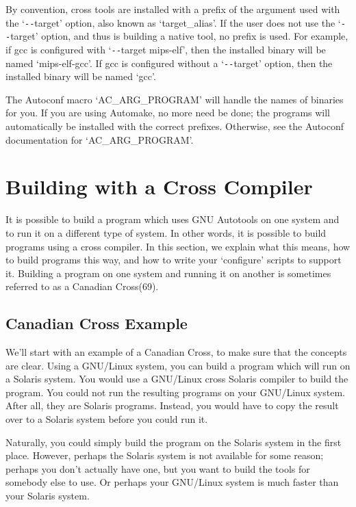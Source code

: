 By convention, cross tools are installed with a prefix of the argument used with the `\verb+--+target' option, also known as `target\_{}alias'. If the user does not use the `\verb+--+target' option, and thus is building a native tool, no prefix is used. For example, if gcc is configured with `\verb+--+target mips-elf', then the installed binary will be named `mips-elf-gcc'. If gcc is configured without a `\verb+--+target' option, then the installed binary will be named `gcc'.

The Autoconf macro `AC\_{}ARG\_{}PROGRAM' will handle the names of binaries for you. If you are using Automake, no more need be done; the programs will automatically be installed with the correct prefixes. Otherwise, see the Autoconf documentation for `AC\_{}ARG\_{}PROGRAM'. 

\section{Building with a Cross Compiler}

It is possible to build a program which uses GNU Autotools on one system and to run it on a different type of system. In other words, it is possible to build programs using a cross compiler. In this section, we explain what this means, how to build programs this way, and how to write your `configure' scripts to support it. Building a program on one system and running it on another is sometimes referred to as a Canadian Cross(69). 

\subsection{Canadian Cross Example}

We'll start with an example of a Canadian Cross, to make sure that the concepts are clear. Using a GNU/Linux system, you can build a program which will run on a Solaris system. You would use a GNU/Linux cross Solaris compiler to build the program. You could not run the resulting programs on your GNU/Linux system. After all, they are Solaris programs. Instead, you would have to copy the result over to a Solaris system before you could run it.

Naturally, you could simply build the program on the Solaris system in the first place. However, perhaps the Solaris system is not available for some reason; perhaps you don't actually have one, but you want to build the tools for somebody else to use. Or perhaps your GNU/Linux system is much faster than your Solaris system.

